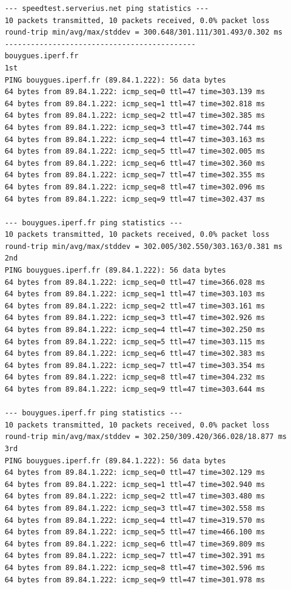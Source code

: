 \documentclass[paper=a4, fontsize=10pt]{scrartcl} %
\numberwithin{equation}{section} %
\numberwithin{figure}{section} %
\numberwithin{table}{section} %
\begin{document}
\begin{lstlisting}
    --- speedtest.serverius.net ping statistics ---
    10 packets transmitted, 10 packets received, 0.0% packet loss
    round-trip min/avg/max/stddev = 300.648/301.111/301.493/0.302 ms
    --------------------------------------------
    bouygues.iperf.fr
    1st
    PING bouygues.iperf.fr (89.84.1.222): 56 data bytes
    64 bytes from 89.84.1.222: icmp_seq=0 ttl=47 time=303.139 ms
    64 bytes from 89.84.1.222: icmp_seq=1 ttl=47 time=302.818 ms
    64 bytes from 89.84.1.222: icmp_seq=2 ttl=47 time=302.385 ms
    64 bytes from 89.84.1.222: icmp_seq=3 ttl=47 time=302.744 ms
    64 bytes from 89.84.1.222: icmp_seq=4 ttl=47 time=303.163 ms
    64 bytes from 89.84.1.222: icmp_seq=5 ttl=47 time=302.005 ms
    64 bytes from 89.84.1.222: icmp_seq=6 ttl=47 time=302.360 ms
    64 bytes from 89.84.1.222: icmp_seq=7 ttl=47 time=302.355 ms
    64 bytes from 89.84.1.222: icmp_seq=8 ttl=47 time=302.096 ms
    64 bytes from 89.84.1.222: icmp_seq=9 ttl=47 time=302.437 ms
    
    --- bouygues.iperf.fr ping statistics ---
    10 packets transmitted, 10 packets received, 0.0% packet loss
    round-trip min/avg/max/stddev = 302.005/302.550/303.163/0.381 ms
    2nd
    PING bouygues.iperf.fr (89.84.1.222): 56 data bytes
    64 bytes from 89.84.1.222: icmp_seq=0 ttl=47 time=366.028 ms
    64 bytes from 89.84.1.222: icmp_seq=1 ttl=47 time=303.103 ms
    64 bytes from 89.84.1.222: icmp_seq=2 ttl=47 time=303.161 ms
    64 bytes from 89.84.1.222: icmp_seq=3 ttl=47 time=302.926 ms
    64 bytes from 89.84.1.222: icmp_seq=4 ttl=47 time=302.250 ms
    64 bytes from 89.84.1.222: icmp_seq=5 ttl=47 time=303.115 ms
    64 bytes from 89.84.1.222: icmp_seq=6 ttl=47 time=302.383 ms
    64 bytes from 89.84.1.222: icmp_seq=7 ttl=47 time=303.354 ms
    64 bytes from 89.84.1.222: icmp_seq=8 ttl=47 time=304.232 ms
    64 bytes from 89.84.1.222: icmp_seq=9 ttl=47 time=303.644 ms
    
    --- bouygues.iperf.fr ping statistics ---
    10 packets transmitted, 10 packets received, 0.0% packet loss
    round-trip min/avg/max/stddev = 302.250/309.420/366.028/18.877 ms
    3rd
    PING bouygues.iperf.fr (89.84.1.222): 56 data bytes
    64 bytes from 89.84.1.222: icmp_seq=0 ttl=47 time=302.129 ms
    64 bytes from 89.84.1.222: icmp_seq=1 ttl=47 time=302.940 ms
    64 bytes from 89.84.1.222: icmp_seq=2 ttl=47 time=303.480 ms
    64 bytes from 89.84.1.222: icmp_seq=3 ttl=47 time=302.558 ms
    64 bytes from 89.84.1.222: icmp_seq=4 ttl=47 time=319.570 ms
    64 bytes from 89.84.1.222: icmp_seq=5 ttl=47 time=466.100 ms
    64 bytes from 89.84.1.222: icmp_seq=6 ttl=47 time=369.809 ms
    64 bytes from 89.84.1.222: icmp_seq=7 ttl=47 time=302.391 ms
    64 bytes from 89.84.1.222: icmp_seq=8 ttl=47 time=302.596 ms
    64 bytes from 89.84.1.222: icmp_seq=9 ttl=47 time=301.978 ms
    

\end{lstlisting}
\end{document}
